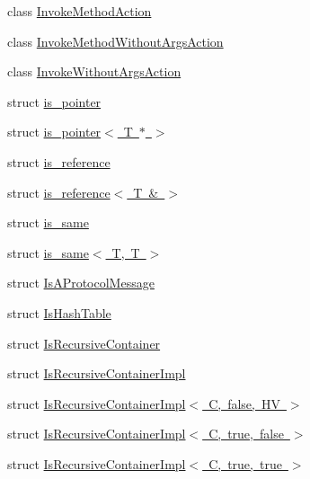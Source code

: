 \begin{DoxyCompactItemize}
\item 
class \mbox{\hyperlink{classtesting_1_1internal_1_1InvokeMethodAction}{Invoke\+Method\+Action}}
\item 
class \mbox{\hyperlink{classtesting_1_1internal_1_1InvokeMethodWithoutArgsAction}{Invoke\+Method\+Without\+Args\+Action}}
\item 
class \mbox{\hyperlink{classtesting_1_1internal_1_1InvokeWithoutArgsAction}{Invoke\+Without\+Args\+Action}}
\item 
struct \mbox{\hyperlink{structtesting_1_1internal_1_1is__pointer}{is\+\_\+pointer}}
\item 
struct \mbox{\hyperlink{structtesting_1_1internal_1_1is__pointer_3_01T_01_5_01_4}{is\+\_\+pointer$<$ T $\ast$ $>$}}
\item 
struct \mbox{\hyperlink{structtesting_1_1internal_1_1is__reference}{is\+\_\+reference}}
\item 
struct \mbox{\hyperlink{structtesting_1_1internal_1_1is__reference_3_01T_01_6_01_4}{is\+\_\+reference$<$ T \& $>$}}
\item 
struct \mbox{\hyperlink{structtesting_1_1internal_1_1is__same}{is\+\_\+same}}
\item 
struct \mbox{\hyperlink{structtesting_1_1internal_1_1is__same_3_01T_00_01T_01_4}{is\+\_\+same$<$ T, T $>$}}
\item 
struct \mbox{\hyperlink{structtesting_1_1internal_1_1IsAProtocolMessage}{Is\+A\+Protocol\+Message}}
\item 
struct \mbox{\hyperlink{structtesting_1_1internal_1_1IsHashTable}{Is\+Hash\+Table}}
\item 
struct \mbox{\hyperlink{structtesting_1_1internal_1_1IsRecursiveContainer}{Is\+Recursive\+Container}}
\item 
struct \mbox{\hyperlink{structtesting_1_1internal_1_1IsRecursiveContainerImpl}{Is\+Recursive\+Container\+Impl}}
\item 
struct \mbox{\hyperlink{structtesting_1_1internal_1_1IsRecursiveContainerImpl_3_01C_00_01false_00_01HV_01_4}{Is\+Recursive\+Container\+Impl$<$ C, false, H\+V $>$}}
\item 
struct \mbox{\hyperlink{structtesting_1_1internal_1_1IsRecursiveContainerImpl_3_01C_00_01true_00_01false_01_4}{Is\+Recursive\+Container\+Impl$<$ C, true, false $>$}}
\item 
struct \mbox{\hyperlink{structtesting_1_1internal_1_1IsRecursiveContainerImpl_3_01C_00_01true_00_01true_01_4}{Is\+Recursive\+Container\+Impl$<$ C, true, true $>$}}
\item 

\end{DoxyCompactItemize}
